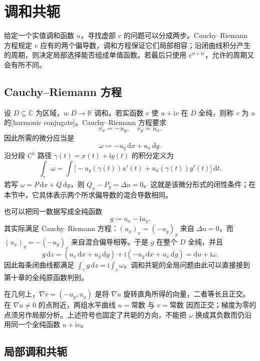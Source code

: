 \section{调和共轭}
\label{b3:sec:1502}

给定一个实值调和函数 \(u\)，寻找虚部 \(v\) 的问题可以分成两步。Cauchy--Riemann 方程规定 \(v\) 应有的两个偏导数，调和方程保证它们局部相容；沿闭曲线积分产生的周期，则决定局部选择能否组成单值函数。若最后只使用 \(e^{u+\mathrm i v}\)，允许的周期又会有所不同。

\subsection{Cauchy–Riemann 方程}
\label{b3:subsec:150201}

设 \(D\subseteq\mathbb C\) 为区域，\(u:D\to\mathbb R\) 调和。若实函数 \(v\) 使 \(u+\mathrm i v\) 在 \(D\) 全纯，则称 \(v\) 为 \(u\) 的[harmonic conjugate]。Cauchy--Riemann 方程要求
\[
 v_x=-u_y,
 \quad v_y=u_x.
\]
因此所需的微分应当是
\[
 \omega\coloneqq-u_y\,\mathrm dx+u_x\,\mathrm dy.
\]
沿分段 \(C^1\) 路径 \(\gamma(t)=x(t)+\mathrm i y(t)\) 的积分定义为
\[
 \int_\gamma\omega
 =\int\bigl[-u_y(\gamma(t))x'(t)
              +u_x(\gamma(t))y'(t)\bigr]\,\mathrm dt.
\]
若写 \(\omega=P\,\mathrm dx+Q\,\mathrm dy\)，则 \(Q_x-P_y=\Delta u=0\)。这就是该微分形式的闭性条件；在本节中，它具体表示两个所求偏导数的混合导数相同。

\ProseParagraphBreak
也可以把同一数据写成全纯函数
\[
 g\coloneqq u_x-\mathrm i u_y.
\]
其实际满足 Cauchy--Riemann 方程：\((u_x)_x=(-u_y)_y\) 来自 \(\Delta u=0\)，而 \((u_x)_y=-(-u_y)_x\) 来自混合偏导相等。于是 \(g\) 在整个 \(D\) 全纯，并且
\[
 g\,\mathrm dz
 =(u_x\,\mathrm dx+u_y\,\mathrm dy)
   +\mathrm i(-u_y\,\mathrm dx+u_x\,\mathrm dy)
 =\mathrm du+\mathrm i\omega.
\]
因此每条闭曲线都满足 \(\int_\gamma g\,\mathrm dz=\mathrm i\int_\gamma\omega\)。调和共轭的全局问题由此可以直接接到第十章的全纯原函数判别。

\ProseParagraphBreak
在几何上，\(\nabla v=(-u_y,u_x)\) 是将 \(\nabla u\) 旋转直角所得的向量，二者等长且正交。在 \(\nabla u\ne0\) 的点附近，两组水平曲线 \(u=\text{常数}\) 与 \(v=\text{常数}\) 因而正交；梯度为零的点须另作局部分析。上述符号也固定了共轭的方向，不能把 \(\omega\) 换成其负数而仍沿用同一个全纯函数 \(u+\mathrm i v\)。

\subsection{局部调和共轭}
\label{b3:subsec:150202}


